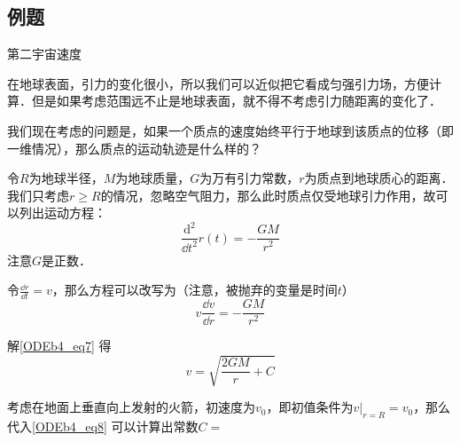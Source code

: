 \subsection{例题}

\begin{example}{第二宇宙速度}

在地球表面，引力的变化很小，所以我们可以近似把它看成匀强引力场，方便计算．但是如果考虑范围远不止是地球表面，就不得不考虑引力随距离的变化了．

我们现在考虑的问题是，如果一个质点的速度始终平行于地球到该质点的位移（即一维情况），那么质点的运动轨迹是什么样的？

令$R$为地球半径，$M$为地球质量，$G$为万有引力常数，$r$为质点到地球质心的距离．我们只考虑$r\geq R$的情况，忽略空气阻力，那么此时质点仅受地球引力作用，故可以列出运动方程：
\begin{equation}
\frac{\mathrm{d}^2}{\dd t^2}r(t)=-\frac{GM}{r^2}
\end{equation}
注意$G$是正数．

令$\frac{\dd r}{\dd t}=v$，那么方程可以改写为（注意，被抛弃的变量是时间$t$）
\begin{equation}\label{ODEb4_eq7}
v\frac{\dd v}{\dd r}=-\frac{GM}{r^2}
\end{equation}

解\autoref{ODEb4_eq7} 得
\begin{equation}\label{ODEb4_eq8}
v=\sqrt{\frac{2GM}{r}+C}
\end{equation}

考虑在地面上垂直向上发射的火箭，初速度为$v_0$，即初值条件为$v|_{r=R}=v_0$，那么代入\autoref{ODEb4_eq8} 可以计算出常数$C=$

\end{example}
















